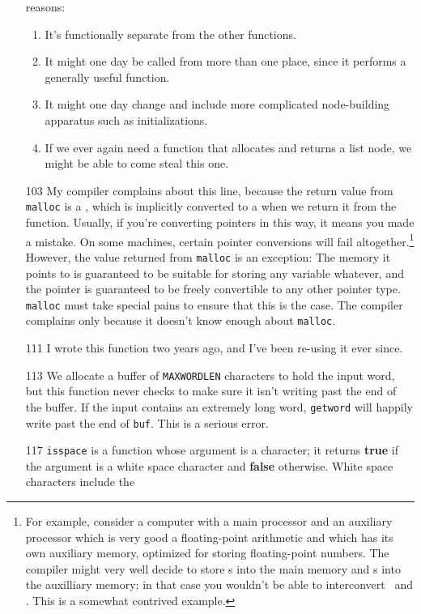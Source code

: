 \begin{itemize}
reasons: 
\begin{enumerate}
\item It's functionally separate from the other functions.
\item It might one day be called from more than one place, since it
performs a generally useful function.
\item It might one day change and include more complicated node-building
apparatus such as initializations. 
\item If we ever again need a function that allocates and returns a list
node, we might be able to come steal this one.
\end{enumerate}
\item[103] My compiler complains about this line, because the return
value from {\tt malloc} is a \Char, which is implicitly converted to
a  when we return it from the function.
Usually, if you're converting pointers in this way, it means you made a
mistake.  On some machines, certain pointer conversions will fail
altogether.\footnote{For example, consider a computer with a main
processor and an auxiliary processor which is very good a floating-point
arithmetic and which has its own auxiliary memory, optimized for storing
floating-point numbers. The compiler might very well decide to store
\int s into the main memory and \float s into 
the auxilliary memory; in that case you wouldn't be able to interconvert
\Int\ and \Float.  This is a somewhat contrived example.}  However,
the value returned from {\tt malloc} is an exception: The memory it
points to is guaranteed to be suitable for storing any variable
whatever, and the pointer is guaranteed to be freely convertible to any
other pointer type.  {\tt malloc} must take special pains to ensure that
this is the case.  The compiler complains only because it doesn't know
enough about {\tt malloc}.
\item[111] I wrote this function two years ago, and I've been re-using
it ever since. 
\item[113] We allocate a buffer of {\tt MAXWORDLEN} characters to hold
the input word, but this function never checks to make sure it isn't
writing past the end of the buffer.  If the input contains an extremely
long word, {\tt getword} will happily write past the end of {\tt buf}.
This is a serious error.
\item[117] {\tt isspace} is a function whose argument is
a character; it returns {\bf true} if the argument is a white space
character and {\bf false} otherwise.  White space characters include the

\end{itemize}
